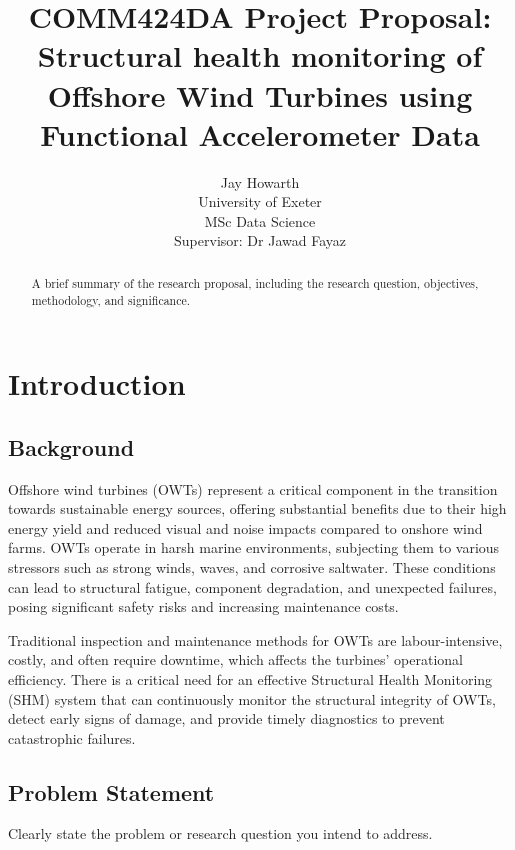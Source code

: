 \documentclass[twocolumn]{article}
\begin{document}
\title{COMM424DA Project Proposal: Structural health monitoring of Offshore Wind Turbines using Functional Accelerometer Data}
\author{Jay Howarth \\
        University of Exeter \\
        MSc Data Science \\
        Supervisor: Dr Jawad Fayaz}
\maketitle

\begin{abstract}
A brief summary of the research proposal, including the research question, objectives, methodology, and significance.
\end{abstract}

\section{Introduction}
\subsection{Background}
Offshore wind turbines (OWTs) represent a critical component in the transition towards sustainable energy sources, 
offering substantial benefits due to their high energy yield and reduced visual and noise impacts compared to onshore wind farms. 
OWTs operate in harsh marine environments, subjecting them to various stressors such as strong winds, waves, and corrosive saltwater. 
These conditions can lead to structural fatigue, component degradation, and unexpected failures, posing significant safety risks and 
increasing maintenance costs.

Traditional inspection and maintenance methods for OWTs are labour-intensive, costly, and often require downtime, which affects the 
turbines' operational efficiency. There is a critical need for an effective Structural Health Monitoring (SHM) system that can continuously 
monitor the structural integrity of OWTs, detect early signs of damage, and provide timely diagnostics to prevent catastrophic failures.

\subsection{Problem Statement}
Clearly state the problem or research question you intend to address.
\end{document}
